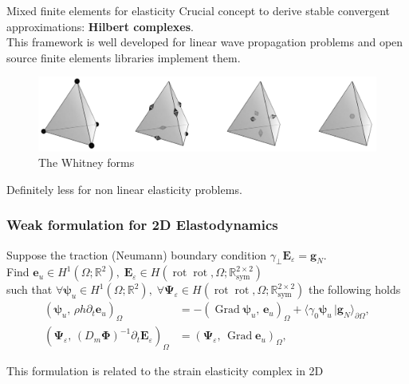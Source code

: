 \documentclass[aspectratio=169]{beamer}
\DeclareMathOperator*{\Grad}{Grad}
\DeclareMathOperator*{\rot}{rot}
\newcommand{\bbR}{\mathbb{R}}
\newcommand{\inpr}[3][]{\ensuremath{( #2, \, #3 )_{#1}}}
\newcommand{\dualpr}[3][]{\ensuremath{\langle #2 \, \vert #3 \rangle_{#1}}}
\begin{document}
\begin{frame}{Mixed finite elements for elasticity}
	Crucial concept to derive stable convergent approximations: \textbf{Hilbert complexes}.\\
	This framework is well developed for linear wave propagation problems  and open source finite elements libraries implement them.
	\begin{figure}
		\centering
			\includegraphics[width=.9\textwidth]{Whitney.png}
		\caption*{The Whitney forms}
	\end{figure}

	Definitely less for non linear elasticity problems.
	
\end{frame}

\begin{frame}[fragile]\frametitle{Weak formulation for 2D Elastodynamics}
	
\begin{tcolorbox}[nobeforeafter, colframe=theme,title=$\Grad$ formulation]%
	Suppose the traction (Neumann) boundary condition $\gamma_\perp\bm{E}_\varepsilon = \bm{g}_N$.\\
	Find $\bm{e}_u \in H^1(\Omega; \bbR^2), \; \bm{E}_{\varepsilon} \in H(\rot\rot, \Omega; \bbR^{2\times 2}_{\text{sym}})$ \\
	such that $\forall \bm{\psi}_u \in H^1(\Omega; \bbR^2), \; \forall \bm{\Psi}_\varepsilon \in H(\rot\rot, \Omega; \bbR^{2\times 2}_{\text{sym}})$ the following holds
	\begin{equation*}
		\begin{aligned}
			\inpr[\Omega]{\bm{\psi}_u}{\rho h \partial_t \bm{e}_u} &= -\inpr[\Omega]{\Grad \bm{\psi}_u}{\bm{e}_u} + \dualpr[\partial\Omega]{\gamma_0\bm{\psi}_u}{\bm{g}_N}, \\
			\inpr[\Omega]{\bm{\Psi}_\varepsilon}{(D_m \bm{\Phi})^{-1} \partial_t \bm{E}_{\varepsilon}} &= \inpr[\Omega]{\bm{\Psi}_\varepsilon}{\Grad \bm{e}_u},
		\end{aligned}
	\end{equation*}
 
\vspace{.5cm}

This formulation is related to the strain elasticity complex in 2D 
\begin{figure}[h]
	\centering
\end{figure}
\end{tcolorbox} 


\end{frame}
\end{document}
